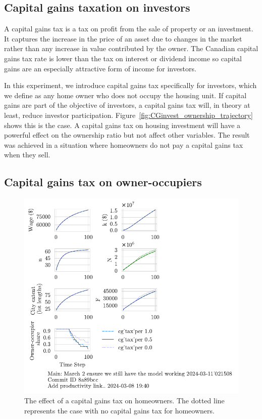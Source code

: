 \subsection{Capital gains taxation on investors}

A \gls{capital gains tax} is a tax on profit from the sale of property or an investment. It captures the increase in the price of an asset due to changes in the market rather than any increase in value contributed by the owner. The Canadian capital gains tax rate is lower than the tax on interest or dividend income so capital gains are an especially attractive form of income for investors.

In this experiment, we introduce capital gains tax specifically for investors, which we define as any home owner who does not occupy the housing unit. If capital gains are part of the objective of investors, a capital gains tax will, in theory at least, reduce investor participation. Figure~\ref{fig:CGinvest_ownership_trajectory} shows this is the case. A capital gains tax on housing investment will have a powerful effect on the ownership ratio but not affect other variables. The result was achieved in a situation where homeowners do not pay a capital gains tax when they sell. 

\newpage

\subsection{Capital gains tax on owner-occupiers}

\begin{figure}[b!]
    \centering
    \includegraphics[scale=1.2, trim={0 1.4cm 0 0},clip]{fig/cg_tax_per-Main-021508.pdf}
    \caption{The effect of a capital gains tax on homeowners. The dotted line represents the case with no capital gains tax for homeowners.}
    \label{fig:CGpers_ownership_trajectory}
\end{figure}

